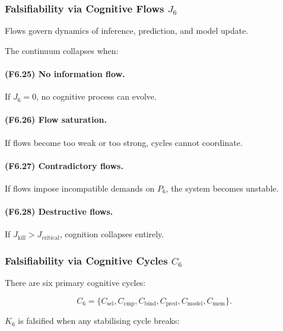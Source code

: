 \subsubsection{Falsifiability via Cognitive Flows \texorpdfstring{$J_6$}{J_6}}

Flows govern dynamics of inference, prediction, and model update.

The continuum collapses when:

\paragraph{(F6.25) No information flow.}
If $J_6=0$, no cognitive process can evolve.

\paragraph{(F6.26) Flow saturation.}
If flows become too weak or too strong,
cycles cannot coordinate.

\paragraph{(F6.27) Contradictory flows.}
If flows impose incompatible demands on $P_6$,
the system becomes unstable.

\paragraph{(F6.28) Destructive flows.}
If $J_{\mathrm{kill}}>J_{\mathrm{critical}}$,
cognition collapses entirely.



\subsubsection{Falsifiability via Cognitive Cycles \texorpdfstring{$C_6$}{C_6}}

There are six primary cognitive cycles:

\[
C_6 = \{
C_{\mathrm{sel}}, C_{\mathrm{cmp}}, C_{\mathrm{bind}},
C_{\mathrm{pred}}, C_{\mathrm{model}}, C_{\mathrm{mem}}
\}.
\]

$K_6$ is falsified when any stabilising cycle breaks:

